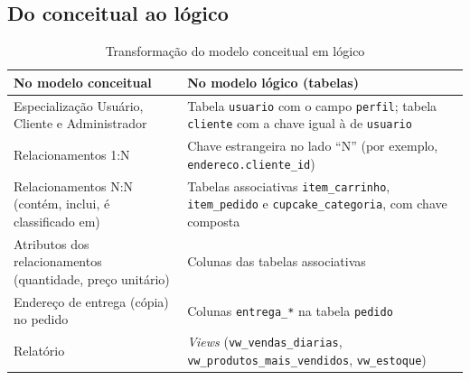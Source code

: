 \documentclass[12pt]{article}
\begin{document}
\subsection{Do conceitual ao lógico}

\begin{table}[H]
\centering\small\renewcommand{\arraystretch}{1.3}
\begin{tabular}{|p{4.6cm}|p{9.2cm}|}
\hline
\rowcolor{gray!30} \textbf{No modelo conceitual} & \textbf{No modelo lógico (tabelas)} \\ \hline
Especialização Usuário, Cliente e Administrador & Tabela \texttt{usuario} com o campo \texttt{perfil}; tabela \texttt{cliente} com a chave igual à de \texttt{usuario} \\ \hline
Relacionamentos 1:N & Chave estrangeira no lado ``N'' (por exemplo, \texttt{endereco.cliente\_id}) \\ \hline
Relacionamentos N:N (contém, inclui, é classificado em) & Tabelas associativas \texttt{item\_carrinho}, \texttt{item\_pedido} e \texttt{cupcake\_categoria}, com chave composta \\ \hline
Atributos dos relacionamentos (quantidade, preço unitário) & Colunas das tabelas associativas \\ \hline
Endereço de entrega (cópia) no pedido & Colunas \texttt{entrega\_*} na tabela \texttt{pedido} \\ \hline
Relatório & \textit{Views} (\texttt{vw\_vendas\_diarias}, \texttt{vw\_produtos\_mais\_vendidos}, \texttt{vw\_estoque}) \\ \hline
\end{tabular}
\caption{Transformação do modelo conceitual em lógico}
\end{table}
\end{document}
